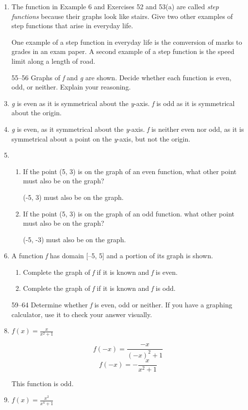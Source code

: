\documentclass{article}
\begin{document}
\begin{enumerate}
	\item The function in Example 6 and Exercises 52 and 53(a) are called \emph{step functions} because
		their graphs look like stairs. Give two other examples of step functions that arise in everyday life.
		
		One example of a step function in everyday life is the comversion of marks to grades in an exam
		paper. A second example of a step function is the speed limit along a length of road.
		
	\item[55--56] Graphs of \emph{f} and \emph{g} are shown. Decide whether each function is even, 
		odd, or neither. Explain your reasoning.
		
	\item \emph{g} is even as it is symmetrical about the \emph{y}-axis. \emph{f} is odd as it is symmetrical
		about the origin.
		
	\item \emph{g} is even, as it symmetrical about the \emph{y}-axis. \emph{f} is neither even nor odd, as
		it is symmetrical about a point on the \emph{y}-axis, but not the origin.
		
	\item
		\begin{enumerate}
			\item If the point (5, 3) is on the graph of an even function, what other point must also
				be on the graph?
				
				(-5, 3) must also be on the graph.
				
			\item If the point (5, 3) is on the graph of an odd function. what other point must also
				be on the graph?
				
				(-5, -3) must also be on the graph.
				
		\end{enumerate}

	\item A function \emph{f} has domain [--5, 5] and a portion of its graph is shown.
		\begin{enumerate}
			\item Complete the graph of \emph{f} if it is known and \emph{f} is even.
			
			\item Complete the graph of \emph{f} if it is known and \emph{f} is odd.
		\end{enumerate}
		
	\item[59--64] Determine whether \emph{f} is even, odd or neither. If you have a graphing calculator,
		use it to check your answer visually.
		
		\item $f(x) = \frac{x}{x^2 + 1}$
		
			$$f(-x) = \frac{-x}{(-x)^2 + 1}$$
			$$f(-x) = - \frac{x}{x^2 + 1}$$
			
			This function is odd.
			
		\item $f(x) = \frac{x^2}{x^4 + 1}$
	\end{enumerate}
	
\end{document}
